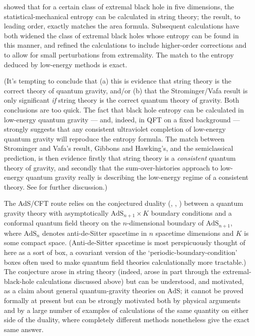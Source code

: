\documentclass{article}
\newcommand{\AdS}{\mbox{AdS}}
\begin{document}
 showed that for a certain class of extremal black hole in five dimensions, the statistical-mechanical entropy can be calculated in string theory; the result, to leading order, exactly matches the area formula. Subsequent calculations have both widened the class of extremal black holes whose entropy can be found in this manner, and refined the calculations to include higher-order corrections and to allow for small perturbations from extremality. The match to the entropy deduced by low-energy methods is exact.

(It's tempting to conclude that (a) this is evidence that string theory is the correct theory of quantum gravity, and/or (b) that the Strominger/Vafa result is only significant \emph{if} string theory is the correct quantum theory of gravity. Both conclusions are too quick. The fact that black hole entropy can be calculated in low-energy quantum gravity --- and, indeed, in QFT on a fixed background --- strongly suggests that any consistent ultraviolet completion of low-energy quantum gravity will reproduce the entropy formula. The match between Strominger and Vafa's result, Gibbons and Hawking's, and the semiclassical prediction, is then evidence firstly that string theory is a \emph{consistent} quantum theory of gravity, and secondly that the sum-over-histories approach to low-energy quantum gravity really is describing the low-energy regime of a consistent theory. See  for further discussion.)

The AdS/CFT route relies on the conjectured duality (, , ) between a quantum gravity theory with asymptotically $\AdS_{n+1}\times K$ boundary conditions and a conformal quantum field theory on the $n$-dimensional boundary of $\AdS_{n+1}$, where $\AdS_{n}$ denotes anti-de-Sitter spacetime in $n$ spacetime dimensions and $K$ is some compact space. (Anti-de-Sitter spacetime is most perspicuously thought of here as a sort of box, a covariant version of the `periodic-boundary-condition' boxes often used to make quantum field theories calculationally more tractable.) The conjecture arose in string theory (indeed, arose in part through the extremal-black-hole calculations discussed above) but can be understood, and motivated, as a claim about general quantum-gravity theories on $\AdS$; it cannot be proved formally at present but can be strongly motivated both by physical arguments and by a large number of examples of calculations of the same quantity on either side of the duality, where completely different methods nonetheless give the exact same answer. 
\end{document}
